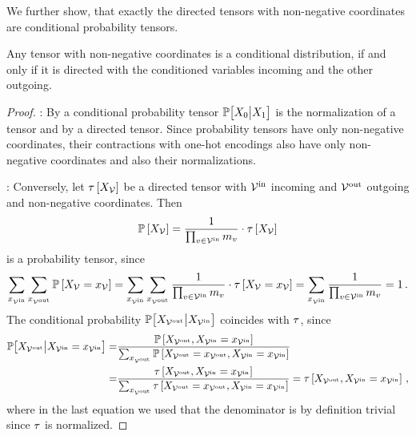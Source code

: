 We further show, that exactly the directed tensors with non-negative coordinates are conditional probability tensors.

\begin{theorem}
    \label{the:conditionalDirected}
    Any tensor with non-negative coordinates is a conditional distribution, if and only if it is directed with the conditioned variables incoming and the other outgoing.
\end{theorem}
\begin{proof}
    \proofrightsymbol:
    By  a conditional probability tensor $\mathbb{P}\big[X_{0}\big|X_{1}\big]$ is the normalization of a tensor and by  a directed tensor.
    Since probability tensors have only non-negative coordinates, their contractions with one-hot encodings also have only non-negative coordinates and also their normalizations.

    \proofleftsymbol:
    Conversely, let $\tau\left[X_{\mathcal{V}}\right]$ be a directed tensor with $\mathcal{V}^{\mathrm{in}}$ incoming and $\mathcal{V}^{\mathrm{out}}$ outgoing and non-negative coordinates.
    Then
    \begin{align}
        \mathbb{P}\left[X_{\mathcal{V}}\right] = \frac{1}{\prod_{v\in\mathcal{V}^{\mathrm{in}}}m_{v}} \cdot \tau\left[X_{\mathcal{V}}\right]
    \end{align}
    is a probability tensor, since
    \begin{align*}
        \sum_{x_{\mathcal{V}^{\mathrm{in}}}} \sum_{x_{\mathcal{V}^{\mathrm{out}}}} \mathbb{P}\left[X_{\mathcal{V}}=x_{\mathcal{V}}\right] =
        \sum_{x_{\mathcal{V}^{\mathrm{in}}}} \sum_{x_{\mathcal{V}^{\mathrm{out}}}} \frac{1}{\prod_{v\in\mathcal{V}^{\mathrm{in}}}m_{v}} \cdot \tau\left[X_{\mathcal{V}}=x_{\mathcal{V}}\right] =
        \sum_{x_{\mathcal{V}^{\mathrm{in}}}} \frac{1}{\prod_{v\in\mathcal{V}^{\mathrm{in}}}m_{v}} = 1 \, .
    \end{align*}
    The conditional probability $\mathbb{P}\big[X_{\mathcal{V}^{\mathrm{out}}}\big|X_{\mathcal{V}^{\mathrm{in}}}\big]$ coincides with $\tau$, since
    \begin{align*}
        \mathbb{P}\big[X_{\mathcal{V}^{\mathrm{out}}}\big|X_{\mathcal{V}^{\mathrm{in}}}=x_{\mathcal{V}^{\mathrm{in}}}\big]
        =& \frac{
            \mathbb{P}\left[X_{\mathcal{V}^{\mathrm{out}}},X_{\mathcal{V}^{\mathrm{in}}}=x_{\mathcal{V}^{\mathrm{in}}}\right]
        }{
            \sum_{x_{\mathcal{V}^{\mathrm{out}}}} \mathbb{P}\left[X_{\mathcal{V}^{\mathrm{out}}}=x_{\mathcal{V}^{\mathrm{out}}},X_{\mathcal{V}^{\mathrm{in}}}=x_{\mathcal{V}^{\mathrm{in}}}\right]
        } \\
        =& \frac{
            \tau\left[X_{\mathcal{V}^{\mathrm{out}}},X_{\mathcal{V}^{\mathrm{in}}}=x_{\mathcal{V}^{\mathrm{in}}}\right]
        }{
            \sum_{x_{\mathcal{V}^{\mathrm{out}}}} \tau\left[X_{\mathcal{V}^{\mathrm{out}}}=x_{\mathcal{V}^{\mathrm{out}}},X_{\mathcal{V}^{\mathrm{in}}}=x_{\mathcal{V}^{\mathrm{in}}}\right]
        }
        = \tau\left[X_{\mathcal{V}^{\mathrm{out}}},X_{\mathcal{V}^{\mathrm{in}}}=x_{\mathcal{V}^{\mathrm{in}}}\right] \, ,
    \end{align*}
    where in the last equation we used that the denominator is by definition trivial since $\tau$ is normalized.
\end{proof}

